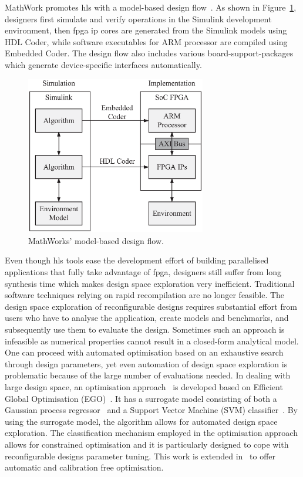 MathWork promotes \gls{hls} with a model-based design flow~\cite{mathworks,sharma09}.
As shown in Figure~\ref{fig:hdlcoder}, designers first simulate and verify operations in the Simulink development environment, then \gls{fpga} \gls{ip} cores are generated from the Simulink models using HDL Coder, while software executables for ARM processor are compiled using Embedded Coder.
The design flow also includes various board-support-packages which generate device-specific interfaces automatically.

\begin{figure}[ht]
\begin{center}
\includegraphics[width=0.7\textwidth]{2_background/figures/hdlcoder}
\end{center}
\caption{MathWorks' model-based design flow.}
\label{fig:hdlcoder}
\end{figure}

Even though \gls{hls} tools ease the development effort of building parallelised applications that fully take advantage of \gls{fpga},
designers still suffer from long synthesis time which makes design space exploration very inefficient.
Traditional software techniques relying on rapid recompilation are no longer feasible.
The design space exploration of reconfigurable designs requires substantial effort from users who have to analyse the application, create models and benchmarks, and subsequently use them to evaluate the design.
Sometimes such an approach is infeasible as numerical properties cannot result in a closed-form analytical model.
One can proceed with automated optimisation based on an exhaustive search through design parameters, yet even automation of design space exploration is problematic because of the large number of evaluations needed.
In dealing with large design space, an optimisation approach~\cite{kurek13arc} is developed based on Efficient Global Optimisation (EGO)~\cite{jones98}.
It has a surrogate model consisting of both a Gaussian process regressor~\cite{rasmussen06} and a Support Vector Machine (SVM) classifier~\cite{basudhar12}.
By using the surrogate model, the algorithm allows for automated design space exploration.
The classification mechanism employed in the optimisation approach allows for constrained optimisation and it is particularly designed to cope with reconfigurable designs parameter tuning. 
This work is extended in~\cite{kurek14fccm} to offer automatic and calibration free optimisation.

